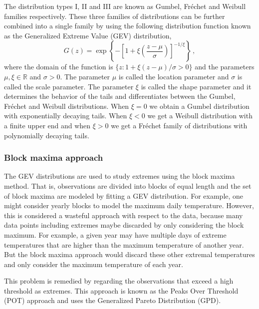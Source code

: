 \documentclass[11pt,a4paper,]{article}
\newcommand\latexcode[1]{#1}
\theoremstyle{definition}
\theoremstyle{definition}
\theoremstyle{definition}
\theoremstyle{remark}
\begin{document}
The distribution types I, II and III are known as Gumbel, \latexcode{Fr\'echet} and Weibull families respectively. These three families of distributions can be further combined into a single family by using the following distribution function known as the Generalized Extreme Value (GEV) distribution,
\begin{equation}\label{eq:EVT4}
    G(z) = \exp\left\{ -\left[ 1 + \xi\left(\frac{z - \mu}{\sigma} \right)\right]^{-1/\xi} \right\}\, , 
\end{equation}
where the domain of the function is \(\{z: 1 + \xi (z - \mu)/\sigma >0 \}\) and the parameters \(\mu, \xi \in \mathbb{R}\) and \(\sigma > 0\). The parameter \(\mu\) is called the location parameter and \(\sigma\) is called the scale parameter. The parameter \(\xi\) is called the shape parameter and it determines the behavior of the tails and differentiates between the Gumbel, \latexcode{Fr\'echet} and Weibull distributions. When \(\xi = 0\) we obtain a Gumbel distribution with exponentially decaying tails. When \(\xi < 0\) we get a Weibull distribution with a finite upper end and when \(\xi > 0\) we get a \latexcode{Fr\'echet} family of distributions with polynomially decaying tails.

\hypertarget{block-maxima-approach}{%
\subsubsection{Block maxima approach}\label{block-maxima-approach}}

The GEV distributions are used to study extremes using the block maxima method. That is, observations are divided into blocks of equal length and the set of block maxima are modeled by fitting a GEV distribution. For example, one might consider yearly blocks to model the maximum daily temperature. However, this is considered a wasteful approach with respect to the data, because many data points including extremes maybe discarded by only considering the block maximum. For example, a given year may have multiple days of extreme temperatures that are higher than the maximum temperature of another year. But the block maxima approach would discard these other extremal temperatures and only consider the maximum temperature of each year.

This problem is remedied by regarding the observations that exceed a high threshold as extremes. This approach is known as the Peaks Over Threshold (POT) approach and uses the Generalized Pareto Distribution (GPD).
\end{document}
